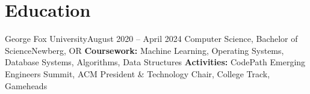 \section{Education}
  \resumeSubHeadingListStart
    \resumeEducationSubheading
        {George Fox University}{August 2020 -- April 2024}
        {Computer Science, Bachelor of Science}{Newberg, OR}
        {\textbf{Coursework:} Machine Learning, Operating Systems, Database Systems, Algorithms, Data Structures}
        {\textbf{Activities:} CodePath Emerging Engineers Summit, ACM President \& Technology Chair, College Track, Gameheads}
  \resumeSubHeadingListEnd


